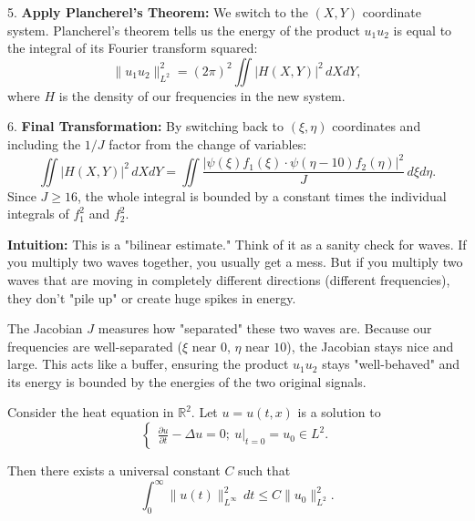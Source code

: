 \begin{solution}
\par\vspace{\baselineskip}
5. \textbf{Apply Plancherel's Theorem:} We switch to the $(X, Y)$ coordinate system. Plancherel's theorem tells us the energy of the product $u_1 u_2$ is equal to the integral of its Fourier transform squared:
\[
\|u_1 u_2\|_{L^2}^2 = (2\pi)^2 \iint |H(X, Y)|^2 \, dX dY,
\]
where $H$ is the density of our frequencies in the new system.

\par\vspace{\baselineskip}
6. \textbf{Final Transformation:} By switching back to $(\xi, \eta)$ coordinates and including the $1/J$ factor from the change of variables:
\[
\iint |H(X, Y)|^2 \, dX dY = \iint \frac{|\psi(\xi)f_1(\xi) \cdot \psi(\eta-10)f_2(\eta)|^2}{J} \, d\xi d\eta.
\]
Since $J \geq 16$, the whole integral is bounded by a constant times the individual integrals of $f_1^2$ and $f_2^2$.

\par\vspace{\baselineskip}
\textbf{Intuition:}
This is a "bilinear estimate." Think of it as a sanity check for waves. If you multiply two waves together, you usually get a mess. But if you multiply two waves that are moving in completely different directions (different frequencies), they don't "pile up" or create huge spikes in energy.

\par\vspace{\baselineskip}
The Jacobian $J$ measures how "separated" these two waves are. Because our frequencies are well-separated ($\xi$ near $0$, $\eta$ near $10$), the Jacobian stays nice and large. This acts like a buffer, ensuring the product $u_1 u_2$ stays "well-behaved" and its energy is bounded by the energies of the two original signals.
\end{solution}

\begin{exercise}
\label{analysis:2024:4}
Consider the heat equation in $\mathbb{R}^2$. Let $u=u(t,x)$ is a solution to
\[
\begin{cases}
\frac{\partial u}{\partial t} - \Delta u = 0;\
u|_{t=0} = u_0\in L^2.
\end{cases}
\]

Then there exists a universal constant $C$ such that
\[
\int_0^{\infty}\|u(t)\|_{L^{\infty}}^2\,dt \leq C\|u_0\|_{L^2}^2.
\]
\end{exercise}

